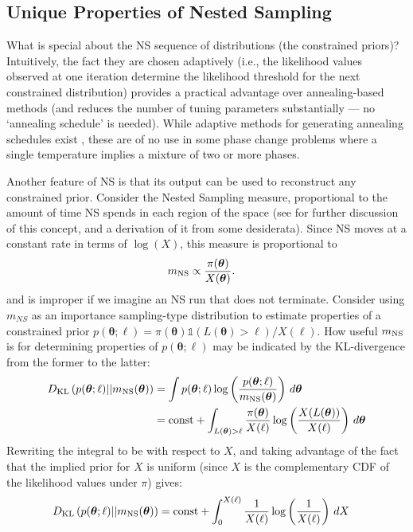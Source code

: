 \documentclass[entropy,article,submit,moreauthors,pdftex,10pt,a4paper]{Definitions/mdpi}
\newcommand{\xx}{\boldsymbol{\theta}}
\begin{document}
\subsection{Unique Properties of Nested Sampling}
What is special about the NS sequence of distributions (the constrained priors)?
Intuitively, the fact they are chosen adaptively (i.e., the likelihood values
observed
at one iteration determine the likelihood threshold for the next constrained
distribution)
provides a practical advantage
over annealing-based methods (and reduces the number of tuning parameters
substantially --- no `annealing schedule' is needed). While adaptive methods
for generating annealing schedules exist \citep{salomone2018unbiased}, these
are of no use in some phase change problems where a single temperature implies
a mixture of two or more phases.

Another feature of NS is that its output can be used to reconstruct
any constrained prior. Consider the Nested Sampling measure, proportional
to the amount of time
NS spends in each region of the space (see \citet{polson2014vertical}
for further discussion of this concept, and a derivation of it from some
desiderata).
Since NS moves at a constant rate
in terms of $\log(X)$, this measure is proportional to
\begin{align}
m_{\rm NS} &\propto \frac{\pi(\xx)}{X(\xx)}.\label{eqn:measure}
\end{align}
and is improper if we imagine an NS run that does not terminate.
Consider using $m_{NS}$ as an importance sampling-type distribution to
estimate properties of a constrained prior
$p(\xx ; \ell) = \pi(\xx)\mathds{1}(L(\xx) > \ell)/X(\ell)$.
How useful $m_{\rm NS}$ is for determining properties of $p(\xx ; \ell)$
may be indicated by the KL-divergence from the former to the latter:
\begin{align}
D_{\rm KL}\left(p(\xx ; \ell) || m_{\rm NS}(\xx)\right)
    &= \int p(\xx ; \ell)
                \log \left(\frac{p(\xx ; \ell)}{m_{\rm NS}(\xx)}\right)
                \, d\xx \\
    &= \textnormal{const} + \int_{L(\xx) > \ell} \frac{\pi(\xx)}{X(\ell)}
                \log \left(\frac{X(L(\xx))}{X(\ell)}\right) \, d\xx
\end{align}
Rewriting the integral to be with respect to $X$, and taking advantage of the
fact that the implied prior for $X$ is uniform (since $X$ is the complementary
CDF of the likelihood values under $\pi$) gives:
\begin{align}
D_{\rm KL}\left(p(\xx ; \ell) || m_{\rm NS}(\xx)\right)
    &= \textnormal{const} + \int_0^{X(\ell)} \frac{1}{X(\ell)}
                \log \left(\frac{1}{X(\ell)}\right) \, dX
\end{align}
\end{document}
